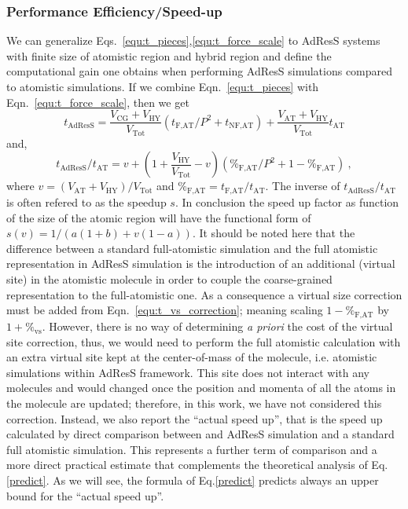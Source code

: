 \documentclass[a4paper,preprint,unsortedaddress]{revtex4-1}
\begin{document}
\subsubsection{Performance Efficiency/Speed-up}
We can generalize Eqs.~\ref{equ:t_pieces},\ref{equ:t_force_scale} to AdResS systems with 
finite size of atomistic region and hybrid region and define the computational gain
one obtains when performing AdResS simulations compared to atomistic simulations.   
If we combine Eqn.~\ref{equ:t_pieces} with Eqn.~\ref{equ:t_force_scale}, then we get
\begin{equation}
	t_\text{AdResS}=\frac{V_\text{CG}+V_\text{HY}}{V_\text{Tot}}\left(t_\text{F,AT}/P^2 + t_\text{NF,AT}\right)+\frac{V_\text{AT}+V_\text{HY}}{V_\text{Tot}} t_\text{AT}
\end{equation}
and,
\begin{equation}
	t_\text{AdResS}/t_\text{AT}=v+\left(1+\frac{V_\text{HY}}{V_\text{Tot}}-v\right)\left(\%_\text{F,AT}/P^2+1-\%_\text{F,AT}\right)~,
\label{predict}
\end{equation}
where $v=(V_\text{AT}+V_\text{HY})/V_\text{Tot}$ and $\%_\text{F,AT}=t_\text{F,AT}/t_\text{AT}$. The inverse of $t_\text{AdResS}/t_\text{AT}$ is often refered to as the speedup $s$.
In conclusion the speed up factor as function of the size of the atomic region will have the functional form of $s(v)=1/(a(1+b)+v(1-a))$.
It should be noted here that the difference between a standard full-atomistic simulation and the full atomistic representation in AdResS simulation is the introduction of an additional (virtual site) in the atomistic molecule in order to couple the
coarse-grained representation to the full-atomistic one.
As a consequence a virtual size correction must be added from Eqn.~\ref{equ:t_vs_correction}; meaning scaling $1-\%_\text{F,AT}$ by $1+\%_\text{vs}$.
However, there is no way of determining {\it a priori} the cost of the virtual site correction, thus, we would need to perform the full
atomistic calculation with an extra virtual site kept at the center-of-mass of the molecule, i.e. atomistic simulations within AdResS framework. This site does not
interact with any molecules and would changed once the position and momenta of all the atoms in the molecule are
updated; therefore, in this work, we have not considered this correction.
Instead, we also report the ``actual speed up'', that is the speed up calculated by direct comparison between and AdResS simulation and a standard full atomistic simulation. This represents a further term of comparison and  a more direct practical estimate that complements the theoretical analysis of Eq.\ref{predict}. As we will see, the formula of Eq.\ref{predict} predicts always an upper bound for the ``actual speed up''.
\end{document}
